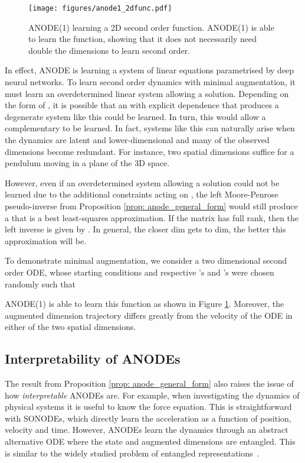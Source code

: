 \documentclass{article}
\theoremstyle{remark}
\theoremstyle{definition}
\begin{document}
\begin{figure}[h]
    \centering
    \texttt{[image: figures/anode1\_2dfunc.pdf]}
    \vspace{-10pt}
    \caption{ANODE(1) learning a 2D second order function. ANODE(1) is able to learn the function, showing that it does not necessarily need double the dimensions to learn second order.}
    \label{fig: anode_1_2dfunc}
\end{figure}

In effect, ANODE is learning a system of linear equations parametrised by deep neural networks. To learn second order dynamics with minimal augmentation, it must learn an overdetermined linear system allowing a solution. Depending on the form of , it is possible that an  with explicit  dependence that produces a degenerate system like this could be learned. In turn, this would allow a complementary  to be learned. In fact, systems like this can naturally arise when the dynamics are latent and lower-dimensional and many of the observed dimensions become redundant. For instance, two spatial dimensions suffice for a pendulum moving in a plane of the 3D space.    

However, even if an overdetermined system allowing a solution could not be learned due to the additional constraints acting on , the left Moore-Penrose pseudo-inverse from Proposition \ref{prop: anode_general_form} would still produce a  that is a best least-squares approximation. If the matrix  has full rank, then the left inverse is given by . In general, the closer dim gets to dim, the better this approximation will be. 

To demonstrate minimal augmentation, we consider a two dimensional second order ODE, whose starting conditions and respective 's and 's were chosen randomly such that

ANODE(1) is able to learn this function as shown in Figure \ref{fig: anode_1_2dfunc}. Moreover, the augmented dimension trajectory differs greatly from the velocity of the ODE in either of the two spatial dimensions.

\subsection{Interpretability of ANODEs}
\label{sec: anodes_interpretability}

The result from Proposition \ref{prop: anode_general_form} also raises the issue of how \textit{interpretable} ANODEs are. For example, when investigating the dynamics of physical systems it is useful to know the force equation. This is straightforward with SONODEs, which directly learn the acceleration as a function of position, velocity and time. However, ANODEs learn the dynamics through an abstract alternative ODE where the state and augmented dimensions are entangled. This is similar to the widely studied problem of entangled representations~\citep{Higgins2017betaVAELB, Mathieu2019DisentanglingDI, bengio2012representation}. 
\end{document}

